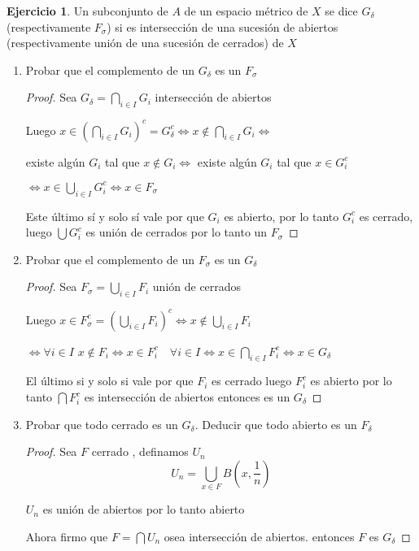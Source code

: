 \documentclass[12pt]{article}
\theoremstyle{definition}
\newtheorem{ej}{Ejercicio}
\begin{document}
\begin{ej}
Un subconjunto de $A$ de un espacio métrico de $X$ se dice $G_{\delta}$ (respectivamente $F_\sigma$) si es intersección de una sucesión de abiertos (respectivamente unión de una sucesión de cerrados) de $X$
\begin{enumerate}
  \item Probar que el complemento de un $ G_{\delta}$ es un $F_{\sigma}$
    \begin{proof}
    Sea $G_{\delta} = \bigcap_{i \in I} G_i$ intersección de abiertos

    Luego $x \in (\bigcap_{i \in I} G_i)^c = G_{\delta}^c \iff x \notin \bigcap_{i \in I}G_i \iff$

    existe algún $G_i$ tal que $x \notin G_i \iff$ existe algún $G_i$ tal que $ x \in G_{i}^c$

    $\iff x \in \bigcup_{i \in I} G_i^c \iff x \in F_{\sigma}$
 
    Este último sí y solo sí vale por que $G_i$ es abierto, por lo tanto $G_{i}^c$ es cerrado, luego $\bigcup G_i^c$ es unión de cerrados por lo tanto un $F_{\sigma}$
    \end{proof}
    \newpage
  \item Probar que el complemento de un $F_{\sigma}$ es un $G_{\delta}$
    \begin{proof}
      Sea $F_{\sigma} = \bigcup_{i \in I}F_i$ unión de cerrados 
      
      Luego $x \in F_{\sigma}^c = (\bigcup_{i \in I} F_i)^c \iff x \notin \bigcup_{i \in I} F_i$ 

      $\iff \forall i \in I$ $x \notin F_i \iff x \in F_i^c \quad \forall i \in I \iff x \in \bigcap_{i \in I} F_i^c \iff x \in G_{\delta}$  

      El último si y solo si vale por que  $F_i$ es cerrado luego $F_i^c$ es abierto por lo tanto $\bigcap F_{i}^c$ es intersección de abiertos entonces es un $G_{\delta}$

    \end{proof}
  \item Probar que todo cerrado es un $G_{\delta}$. Deducir que todo abierto es un $F_{\delta}$
\begin{proof}
  Sea $F$ cerrado , definamos $U_n$ $$U_n = \bigcup_{x \in F} B(x,\frac{1}{n})$$

  $U_n$ es unión de abiertos por lo tanto abierto

  Ahora firmo que $F = \bigcap U_n$ osea intersección de abiertos. entonces $F$ es $G_{\delta}$


\end{proof}
\end{enumerate}
\end{ej}
\end{document}
